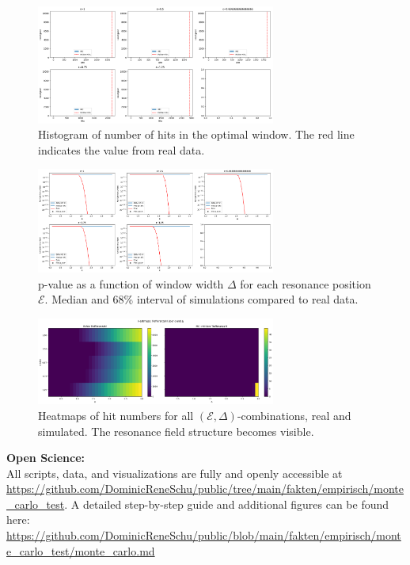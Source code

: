 \documentclass[12pt]{iopart}
\providecommand{\mathcal}[1]{\mathscr{#1}}
\begin{document}
\begin{figure}[ht]
	\centering
	\includegraphics[width=0.7\textwidth]{figures/hist_mc_vs_real_hits.png}
	\caption{Histogram of number of hits in the optimal window. The red line indicates the value from real data.}
	\label{fig:mc_results_hist}
\end{figure}

\begin{figure}[ht]
	\centering
	\includegraphics[width=0.7\textwidth]{figures/pvalue_curves.png}
	\caption{p-value as a function of window width $\Delta$ for each resonance position $\mathcal{E}$. Median and 68\% interval of simulations compared to real data.}
	\label{fig:mc_results_pvalue}
\end{figure}

\begin{figure}[ht]
	\centering
	\includegraphics[width=0.7\textwidth]{figures/heatmaps_hits.png}
	\caption{Heatmaps of hit numbers for all $(\mathcal{E}, \Delta)$-combinations, real and simulated. The resonance field structure becomes visible.}
	\label{fig:mc_results_heatmap}
\end{figure}

\textbf{Open Science:}\\
All scripts, data, and visualizations are fully and openly accessible at \url{https://github.com/DominicReneSchu/public/tree/main/fakten/empirisch/monte_carlo_test}. A detailed step-by-step guide and additional figures can be found here:\\
\url{https://github.com/DominicReneSchu/public/blob/main/fakten/empirisch/monte_carlo_test/monte_carlo.md}
\end{document}
